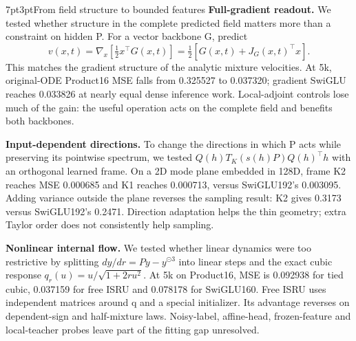 \documentclass[11pt]{article}
\makeatletter
\renewcommand\section{\@startsection{section}{1}{\z@}%
 {7pt\@plus2pt\@minus2pt}{3pt}{\normalfont\large\bfseries}}
\makeatother
\begin{document}
\newpage
\section{From field structure to bounded features}
\textbf{Full-gradient readout.} We tested whether structure in the complete
predicted field matters more than a constraint on hidden P. For a vector
backbone G, predict
\begin{equation}
v(x,t)=\nabla_x[\tfrac12x^\top G(x,t)]
=\tfrac12[G(x,t)+J_G(x,t)^\top x].
\end{equation}
This matches the gradient structure of the analytic mixture velocities.
At 5k, original-ODE Product16 MSE falls from 0.325527 to 0.037320; gradient
SwiGLU reaches 0.033826 at nearly equal dense inference work. Local-adjoint
controls lose much of the gain: the useful operation acts on the complete
field and benefits both backbones.

\textbf{Input-dependent directions.} To change the directions in which P acts
while preserving its pointwise spectrum, we tested
$Q(h)T_K(s(h)P)Q(h)^\top h$ with an orthogonal learned frame. On a 2D mode
plane embedded in 128D, frame K2 reaches MSE 0.000685 and K1 reaches
0.000713, versus SwiGLU192's 0.003095. Adding variance outside the plane
reverses the sampling result: K2 gives 0.3173 versus SwiGLU192's 0.2471.
Direction adaptation helps the thin geometry; extra Taylor order does not
consistently help sampling.

\textbf{Nonlinear internal flow.} We tested whether linear dynamics were too
restrictive by splitting $dy/dr=Py-y^{\odot3}$ into linear steps and the exact
cubic response $q_r(u)=u/\sqrt{1+2ru^2}$. At 5k on Product16, MSE is 0.092938
for tied cubic, 0.037159 for free ISRU and 0.078178 for SwiGLU160. Free ISRU
uses independent matrices around q and a special initializer. Its advantage
reverses on dependent-sign and half-mixture laws. Noisy-label, affine-head,
frozen-feature and local-teacher probes leave part of the fitting gap unresolved.
\end{document}
